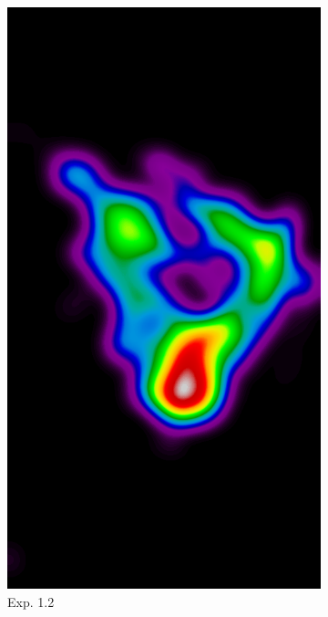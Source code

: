 \documentclass{beamer}
\begin{document}
\begin{frame}
\begin{figure}
\begin{subfigure}{0.134\textwidth}
		            \includegraphics[width=\textwidth]{plots/examples/example5_probs_1_2.png}
	            \caption*{\footnotesize Exp. 1.2}
            \end{subfigure}
            \begin{subfigure}{0.134\textwidth}
	            \centering

\end{subfigure}
\end{figure}
\end{frame}
\end{document}
